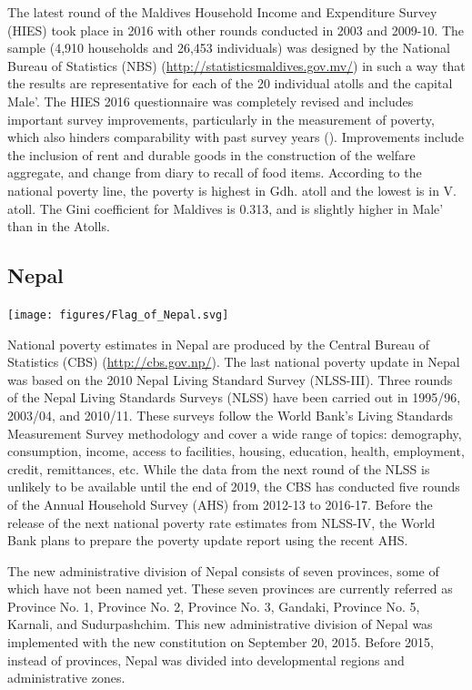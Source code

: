 \documentclass[13 pt,]{book}
\begin{document}
The latest round of the Maldives Household Income and Expenditure Survey
(HIES) took place in 2016 with other rounds conducted in 2003 and
2009-10. The sample (4,910 households and 26,453 individuals) was
designed by the National Bureau of Statistics (NBS)
(\url{http://statisticsmaldives.gov.mv/}) in such a way that the results
are representative for each of the 20 individual atolls and the capital
Male'. The HIES 2016 questionnaire was completely revised and includes
important survey improvements, particularly in the measurement of
poverty, which also hinders comparability with past survey years
(\citet{maldives_2018}). Improvements include the inclusion of rent and
durable goods in the construction of the welfare aggregate, and change
from diary to recall of food items. According to the national poverty
line, the poverty is highest in Gdh. atoll and the lowest is in V.
atoll. The Gini coefficient for Maldives is 0.313, and is slightly
higher in Male' than in the Atolls.

\subsection{Nepal}\label{nepal}

\begin{flushleft}\texttt{[image: figures/Flag\_of\_Nepal.svg]} \end{flushleft}

National poverty estimates in Nepal are produced by the Central Bureau
of Statistics (CBS) (\url{http://cbs.gov.np/}). The last national
poverty update in Nepal was based on the 2010 Nepal Living Standard
Survey (NLSS-III). Three rounds of the Nepal Living Standards Surveys
(NLSS) have been carried out in 1995/96, 2003/04, and 2010/11. These
surveys follow the World Bank's Living Standards Measurement Survey
methodology and cover a wide range of topics: demography, consumption,
income, access to facilities, housing, education, health, employment,
credit, remittances, etc. While the data from the next round of the NLSS
is unlikely to be available until the end of 2019, the CBS has conducted
five rounds of the Annual Household Survey (AHS) from 2012-13 to
2016-17. Before the release of the next national poverty rate estimates
from NLSS-IV, the World Bank plans to prepare the poverty update report
using the recent AHS.

The new administrative division of Nepal consists of seven provinces,
some of which have not been named yet. These seven provinces are
currently referred as Province No. 1, Province No. 2, Province No. 3,
Gandaki, Province No. 5, Karnali, and Sudurpashchim. This new
administrative division of Nepal was implemented with the new
constitution on September 20, 2015. Before 2015, instead of provinces,
Nepal was divided into developmental regions and administrative zones.
\end{document}
